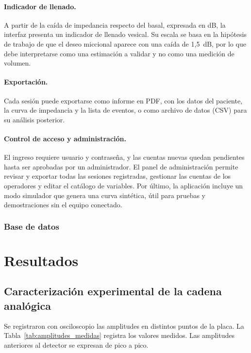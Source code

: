 \documentclass[12pt,a4paper]{article}
\begin{document}
\paragraph{Indicador de llenado.} A partir de la caída de impedancia respecto del basal, expresada en dB, la interfaz presenta un indicador de llenado vesical. Su escala se basa en la hipótesis de trabajo de que el deseo miccional aparece con una caída de 1,5~dB, por lo que debe interpretarse como una estimación a validar y no como una medición de volumen.

\paragraph{Exportación.} Cada sesión puede exportarse como informe en PDF, con los datos del paciente, la curva de impedancia y la lista de eventos, o como archivo de datos (CSV) para su análisis posterior.

\paragraph{Control de acceso y administración.} El ingreso requiere usuario y contraseña, y las cuentas nuevas quedan pendientes hasta ser aprobadas por un administrador. El panel de administración permite revisar y exportar todas las sesiones registradas, gestionar las cuentas de los operadores y editar el catálogo de variables. Por último, la aplicación incluye un modo simulador que genera una curva sintética, útil para pruebas y demostraciones sin el equipo conectado.

\subsubsection{Base de datos}


\section{Resultados}
\label{sec:resultados}

\subsection{Caracterización experimental de la cadena analógica}
Se registraron con osciloscopio las amplitudes en distintos puntos de la placa. La Tabla~\ref{tab:amplitudes_medidas} registra los valores 
medidos. Las amplitudes anteriores al detector se expresan de pico a pico.
\end{document}
